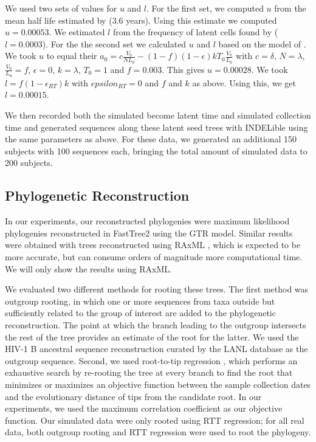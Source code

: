 \documentclass[12pt]{article}
\begin{document}
We used two sets of values for $u$ and $l$.
For the first set, we computed $u$ from the mean half life estimated by \cite{Crooks15} ($3.6$ years).
Using this estimate we computed $u = 0.00053$.
We estimated $l$ from the frequency of latent cells found by \cite{Ho13} ($l=0.0003$).
For the the second set we calculated $u$ and $l$ based on the model of \cite{Kim06}.
We took $u$ to equal their $a_0 = c\frac{V_0}{NL_0}-(1-f)(1-\epsilon)kT_0\frac{V_0}{L_0}$ with $c = \delta$, $N = \lambda$,  $\frac{V_0}{L_0} = f$, $\epsilon = 0$, $k = \lambda$, $T_0 = 1$ and $f = 0.003$.
This gives $u = 0.00028$.
We took $l = f(1-\epsilon_{RT})k$ with $epsilon_{RT} = 0$ and $f$ and $k$ as above.
Using this, we get $l = 0.00015$.

We then recorded both the simulated become latent time and simulated collection time and generated sequences along these latent seed trees with INDELible using the same parameters as above. 
For these data, we generated an additional 150 subjects with 100 sequences each, bringing the total amount of simulated data to 200 subjects.

\subsection * {Phylogenetic Reconstruction} \label{subsec:phylo}
In our experiments, our reconstructed phylogenies were maximum likelihood phylogenies reconstructed in FastTree2 \citep{FastTree10} using the GTR model.
Similar results were obtained with trees reconstructed using RAxML \citep{Raxml14}, which is expected to be more accurate, but can consume orders of magnitude more computational time.
We will only show the results using RAxML.

We evaluated two different methods for rooting these trees. 
The first method was outgroup rooting, in which one or more sequences from taxa outside but sufficiently related to the group of interest are added to the phylogenetic reconstruction.
The point at which the branch leading to the outgroup intersects the rest of the tree provides an estimate of the root for the latter.
We used the HIV-1 B ancestral sequence reconstruction curated by the LANL database \citep{LosAlamos} as the outgroup sequence.
Second, we used root-to-tip regression \citep[RTT;][]{Korber00}, which performs an exhaustive search by re-rooting the tree at every branch to find the root that minimizes or maximizes an objective function between the sample collection dates and the evolutionary distance of tips from the candidate root.
In our experiments, we used the maximum correlation coefficient as our objective function.
Our simulated data were only rooted using RTT regression; for all real data, both outgroup rooting and RTT regression were used to root the phylogeny.
\end{document}
